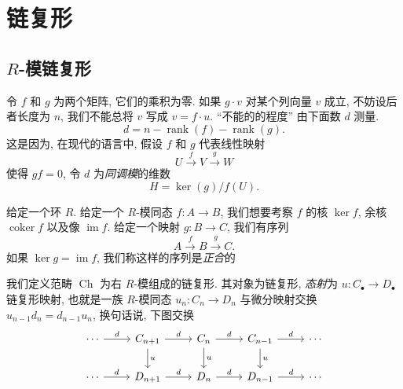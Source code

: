 \chapter{链复形}

\section{\texorpdfstring{\( R \)}{R}-模链复形}

\begin{example}
  令 \( f \) 和 \( g \) 为两个矩阵, 它们的乘积为零. 如果 \( g \cdot v \)
  对某个列向量 \( v \) 成立, 不妨设后者长度为 \( n \), 我们不能总将 \( v \) 写成
  \( v = f \cdot u \). ``不能的的程度'' 由下面数 \( d \) 测量.
  \[
    d = n - \operatorname{rank}(f) - \operatorname{rank}(g).
  \]
  这是因为, 在现代的语言中, 假设 \( f \) 和 \( g \) 代表线性映射
  \[
    U \xrightarrow{f} V \xrightarrow{g} W
  \]
  使得 \( gf = 0 \), 令 \( d \) 为\emph{同调模}的维数
  \[
    H = \operatorname{ker}(g) / f(U).
  \]
\end{example}

给定一个环 \( R \). 给定一个 \( R \)-模同态 \( f: A \to B \), 我们想要考察 \( f
\) 的核 \( \operatorname{ker}f \), 余核 \( \operatorname{coker}f \) 以及像
\( \operatorname{im}f \). 给定一个映射 \( g: B \to C \), 我们有序列
\[
  A \xrightarrow{f} B \xrightarrow{g} C.
\]
如果 \( \operatorname{ker} g = \operatorname{im} f \), 我们称这样的序列是\emph{正合}的

我们定义范畴 \( \operatorname{Ch} \) 为右 \( R \)-模组成的链复形.
其对象为链复形, \emph{态射}为 \( u: C_{\bullet} \to D_{\bullet} \) 链复形映射,
也就是一族 \( R \)-模同态 \( u_n: C_n \to D_n \) 与微分映射交换 \( u_{n - 1} d_n
= d_{n - 1} u_n \), 换句话说, 下图交换
\[\begin{tikzcd}
	\cdots & {C_{n + 1}} & {C_n} & {C_{n - 1}} & \cdots \\
	\cdots & {D_{n + 1}} & {D_n} & {D_{n - 1}} & \cdots
	\arrow["d", from=1-1, to=1-2]
	\arrow["d", from=1-2, to=1-3]
	\arrow["u", from=1-2, to=2-2]
	\arrow["d", from=1-3, to=1-4]
	\arrow["u", from=1-3, to=2-3]
	\arrow["d", from=1-4, to=1-5]
	\arrow["u", from=1-4, to=2-4]
	\arrow["d", from=2-1, to=2-2]
	\arrow["d", from=2-2, to=2-3]
	\arrow["d", from=2-3, to=2-4]
	\arrow["d", from=2-4, to=2-5]
\end{tikzcd}\]

